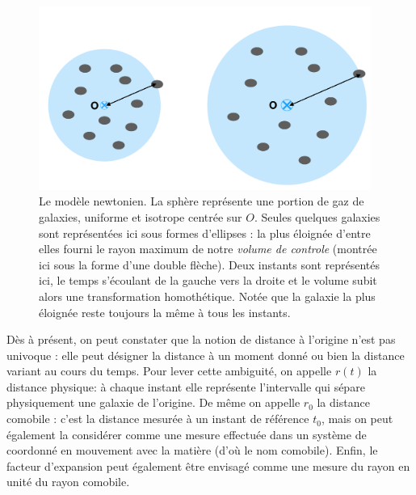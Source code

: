 \begin{figure}[htbp]
	\centering
		\includegraphics[height=6cm]{figs/newton.png}
	\caption[le modèle cosmologique newtonien]{Le modèle newtonien. La sphère représente une portion de gaz de galaxies, uniforme et isotrope centrée sur $O$. Seules quelques galaxies sont représentées ici sous formes d'ellipses : la plus éloignée d'entre elles fourni le rayon maximum de notre \textit{volume de controle} (montrée ici sous la forme d'une double flèche). Deux instants sont représentés ici, le temps s'écoulant de la gauche vers la droite et le volume subit alors une transformation homothétique. Notée que la galaxie la plus éloignée reste toujours la même à tous les instants.}
	\label{f:newton}
\end{figure}

Dès à présent, on peut constater que la notion de distance à l'origine n'est pas univoque : elle peut désigner la distance à un moment donné ou bien la distance variant au cours du temps. Pour lever cette ambiguité, on appelle $r(t)$ la distance physique: à chaque instant elle représente l'intervalle qui sépare physiquement une galaxie de l'origine. De même on appelle $r_0$ la distance  comobile : c'est la distance mesurée à un instant de référence $t_0$, mais on peut également la considérer comme une mesure effectuée dans un système de coordonné en mouvement avec la matière (d'où le nom comobile). Enfin, le facteur d'expansion peut également être envisagé comme une mesure du rayon en unité du rayon comobile.

